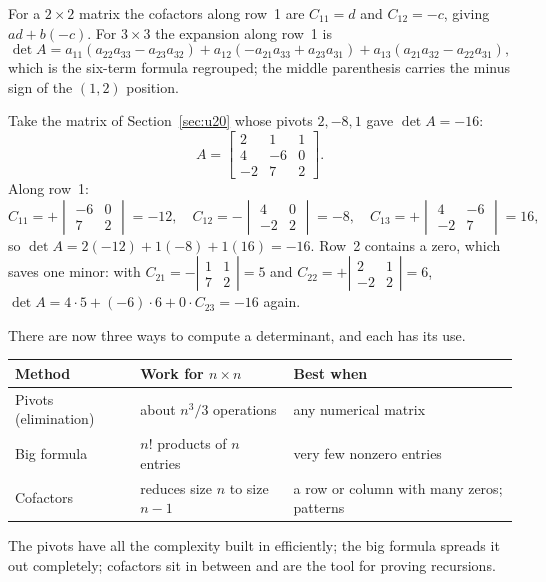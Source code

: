 For a $2\times 2$ matrix the cofactors along row~1 are $C_{11}=d$ and $C_{12}=-c$, giving
$ad+b(-c)$. For $3\times 3$ the expansion along row~1 is
\[
  \det A=a_{11}(a_{22}a_{33}-a_{23}a_{32})+a_{12}(-a_{21}a_{33}+a_{23}a_{31})+a_{13}(a_{21}a_{32}-a_{22}a_{31}),
\]
which is the six-term formula regrouped; the middle parenthesis carries the minus sign of the
$(1,2)$ position.

\begin{example}\label{ex:u21-expand}
Take the matrix of Section~\ref{sec:u20} whose pivots $2,-8,1$ gave $\det A=-16$:
\[
  A=\begin{bmatrix}2&1&1\\4&-6&0\\-2&7&2\end{bmatrix}.
\]
Along row~1:
\[
  C_{11}=+\begin{vmatrix}-6&0\\7&2\end{vmatrix}=-12,\quad
  C_{12}=-\begin{vmatrix}4&0\\-2&2\end{vmatrix}=-8,\quad
  C_{13}=+\begin{vmatrix}4&-6\\-2&7\end{vmatrix}=16,
\]
so $\det A=2(-12)+1(-8)+1(16)=-16$. Row~2 contains a zero, which saves one minor: with
$C_{21}=-\left|\begin{smallmatrix}1&1\\7&2\end{smallmatrix}\right|=5$ and
$C_{22}=+\left|\begin{smallmatrix}2&1\\-2&2\end{smallmatrix}\right|=6$,
$\det A=4\cdot 5+(-6)\cdot 6+0\cdot C_{23}=-16$ again.
\end{example}

There are now three ways to compute a determinant, and each has its use.
\begin{center}
\begin{tabular}{@{}lll@{}}
  \toprule
  Method & Work for $n\times n$ & Best when \\
  \midrule
  Pivots (elimination) & about $n^3/3$ operations & any numerical matrix \\
  Big formula & $n!$ products of $n$ entries & very few nonzero entries \\
  Cofactors & reduces size $n$ to size $n-1$ & a row or column with many zeros; patterns \\
  \bottomrule
\end{tabular}
\end{center}
The pivots have all the complexity built in efficiently; the big formula spreads it out
completely; cofactors sit in between and are the tool for proving recursions.

